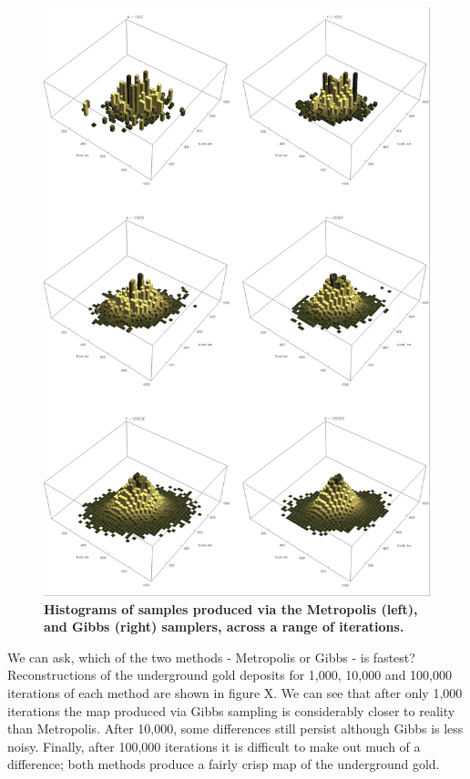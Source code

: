 \documentclass[11pt,fullpage]{book}
\begin{document}
\begin{figure}
\centerline{\includegraphics[width=1\textwidth]{Gibbs_goldMiningAgain3.png}}
\caption{\textbf{Histograms of samples produced via the Metropolis (left), and Gibbs (right) samplers, across a range of iterations.}}\label{fig:Gibbs_goldMiningAgain3}
\end{figure}

We can ask, which of the two methods - Metropolis or Gibbs - is fastest? Reconstructions of the underground gold deposits for 1,000, 10,000 and 100,000 iterations of each method are shown in figure X. We can see that after only 1,000 iterations the map produced via Gibbs sampling is considerably closer to reality than Metropolis. After 10,000, some differences still persist although Gibbs is less noisy. Finally, after 100,000 iterations it is difficult to make out much of a difference; both methods produce a fairly crisp map of the underground gold. 
\end{document}
